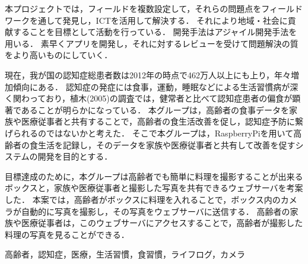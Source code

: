 \documentclass[../report]{subfiles}
\begin{document}
\begin{jabstract}
本プロジェクトでは，フィールドを複数設定して，それらの問題点をフィールドワークを通して発見し，ICTを活用して解決する．
それにより地域・社会に貢献することを目標として活動を行っている．
開発手法はアジャイル開発手法を用いる．
素早くアプリを開発し，それに対するレビューを受けて問題解決の質をより高いものにしていく．

現在，我が国の認知症総患者数は2012年の時点で462万人以上にも上り，年々増加傾向にある\cite{zouka}．
認知症の発症には食事，運動，睡眠などによる生活習慣病が深く関わっており，植木(2005)の調査では，健常者と比べて認知症患者の偏食が顕著であることが明らかになっている\cite{ueki}．
本グループは，高齢者の食事データを家族や医療従事者と共有することで，高齢者の食生活改善を促し，認知症予防に繋げられるのではないかと考えた．
そこで本グループは，RaspberryPiを用いて高齢者の食生活を記録し，そのデータを家族や医療従事者と共有して改善を促すシステムの開発を目的とする．

目標達成のために，本グループは高齢者でも簡単に料理を撮影することが出来るボックスと，家族や医療従事者と撮影した写真を共有できるウェブサーバを考案した．
本案では，高齢者がボックスに料理を入れることで，ボックス内のカメラが自動的に写真を撮影し，その写真をウェブサーバに送信する．
高齢者の家族や医療従事者は，このウェブサーバにアクセスすることで，高齢者が撮影した料理の写真を見ることができる．
\begin{jkeyword}
高齢者，認知症，医療，生活習慣，食習慣，ライフログ，カメラ
\end{jkeyword}
\end{jabstract}
\end{document}
